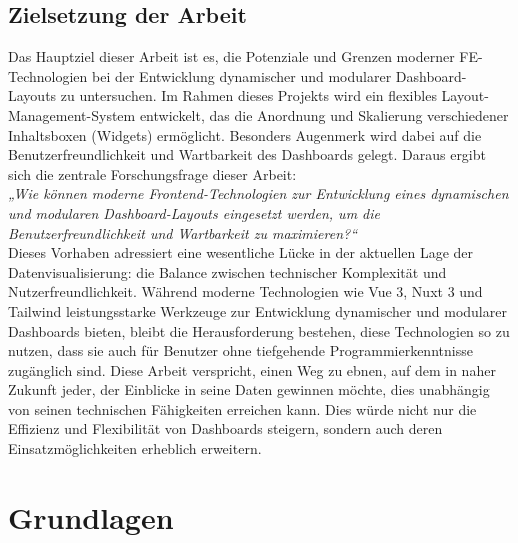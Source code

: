 \documentclass[a4paper, 12pt]{scrartcl}
\begin{document}
\subsection{Zielsetzung der Arbeit}
Das Hauptziel dieser Arbeit ist es, die Potenziale und Grenzen moderner \ac{FE}-Technologien bei der Entwicklung dynamischer und modularer Dashboard-Layouts zu untersuchen. Im Rahmen dieses Projekts wird ein flexibles Layout-Management-System entwickelt, das die Anordnung und Skalierung verschiedener Inhaltsboxen (Widgets) ermöglicht. Besonders Augenmerk wird dabei auf die Benutzerfreundlichkeit und Wartbarkeit des Dashboards gelegt. Daraus ergibt sich die zentrale Forschungsfrage dieser Arbeit:\\[1em]
\textit{„Wie können moderne Frontend-Technologien zur Entwicklung eines dynamischen und modularen Dashboard-Layouts eingesetzt werden, um die Benutzerfreundlichkeit und Wartbarkeit zu maximieren?“}\\[1em] Dieses Vorhaben adressiert eine wesentliche Lücke in der aktuellen Lage der Datenvisualisierung: die Balance zwischen technischer Komplexität und Nutzerfreundlichkeit. Während moderne Technologien wie Vue 3, Nuxt 3 und \ac{Tailwind} leistungsstarke Werkzeuge zur Entwicklung dynamischer und modularer Dashboards bieten, bleibt die Herausforderung bestehen, diese Technologien so zu nutzen, dass sie auch für Benutzer ohne tiefgehende Programmierkenntnisse zugänglich sind. Diese Arbeit verspricht, einen Weg zu ebnen, auf dem in naher Zukunft jeder, der Einblicke in seine Daten gewinnen möchte, dies unabhängig von seinen technischen Fähigkeiten erreichen kann. Dies würde nicht nur die Effizienz und Flexibilität von Dashboards steigern, sondern auch deren Einsatzmöglichkeiten erheblich erweitern.
\clearpage
	\section{Grundlagen}
	\label{sec:grundlagen}
 
\end{document}
